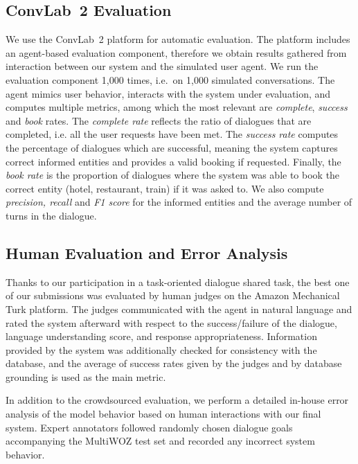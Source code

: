 \documentclass[11pt,a4paper]{article}
\begin{document}
\subsection{ConvLab~2 Evaluation}
\label{sec:convlab-eval}

We use the ConvLab~2 platform \cite{zhu2020} for automatic evaluation.
The platform includes an agent-based evaluation component, therefore we obtain results gathered from interaction between our system and the simulated user agent.
We run the evaluation component 1,000 times, i.e.\ on 1,000 simulated conversations.
The agent mimics user behavior, interacts with the system under evaluation, and computes multiple metrics, among which the most relevant are \emph{complete}, \emph{success} and \emph{book} rates.
The \emph{complete rate} reflects the ratio of dialogues that are completed, i.e. all the user requests have been met.
The \emph{success rate} computes the percentage of dialogues which are successful, meaning the system captures correct informed entities and provides a valid booking if requested.
Finally, the \emph{book rate} is the proportion of dialogues where the system was able to book the correct entity (hotel, restaurant, train) if it was asked to.
We also compute \emph{precision, recall} and \emph{F1 score} for the informed entities and the average number of turns in the dialogue.

\subsection{Human Evaluation and Error Analysis}

Thanks to our participation in a task-oriented dialogue shared task, the best one of our submissions was evaluated by human judges on the Amazon Mechanical Turk platform. The judges communicated with the agent in natural language and rated the system afterward with respect to the success/failure of the dialogue, language understanding score, and response appropriateness. Information provided by the system was additionally checked for consistency with the database, and the average of success rates given by the judges and by database grounding is used as the main metric.

In addition to the crowdsourced evaluation, we perform a detailed in-house error analysis of the model behavior based on human interactions with our final system. Expert annotators followed randomly chosen dialogue goals accompanying the MultiWOZ test set and recorded any incorrect system behavior.
\end{document}
